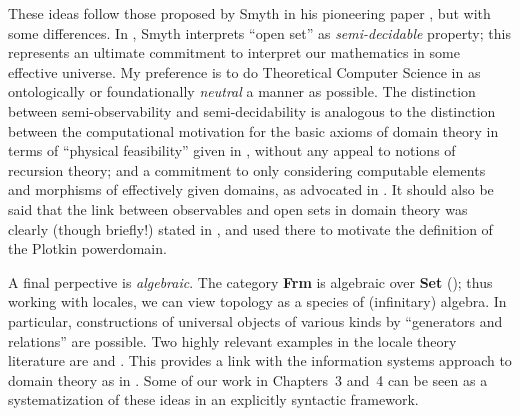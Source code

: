 These ideas follow those proposed by Smyth in his pioneering paper \cite{Smy83}, but with some differences.
In \cite{Smy83}, Smyth interprets ``open set'' as {\em semi-decidable} property; this represents an ultimate commitment to interpret our mathematics in some effective universe.
My preference is to do Theoretical Computer Science in as ontologically or foundationally {\em neutral} a manner as possible.
The distinction between semi-observability and semi-decidability is analogous 
to the distinction between the computational motivation for the basic axioms 
of domain theory in terms of ``physical feasibility'' given in 
\cite[Chapter 1]{PloLN}, without any appeal to notions of recursion theory; and a commitment to only considering computable elements and morphisms of effectively given domains, as advocated in \cite{Kan79}.
It should also be said that the link between observables and open sets in domain theory was clearly (though briefly!) stated in \cite[Chapter 8 p.\  16]{PloLN}, and used there to motivate the definition of the Plotkin powerdomain.

A final perpective is {\em algebraic}.
The category {\bf Frm} is algebraic over {\bf Set} (\cite[II.1.2]{Joh82}); thus working with locales, we can view topology as a species of (infinitary) algebra.
In particular,  constructions of universal objects of various kinds by ``generators and relations'' are possible.
Two highly relevant examples in the locale theory literature are \cite{Joh85} and \cite{Hyl81}. 
This provides a link with the information systems approach to domain theory as in \cite{Sco82,LW84}.
Some of our work in Chapters~3 and~4 can be seen as a systematization of these ideas in an explicitly syntactic framework.

